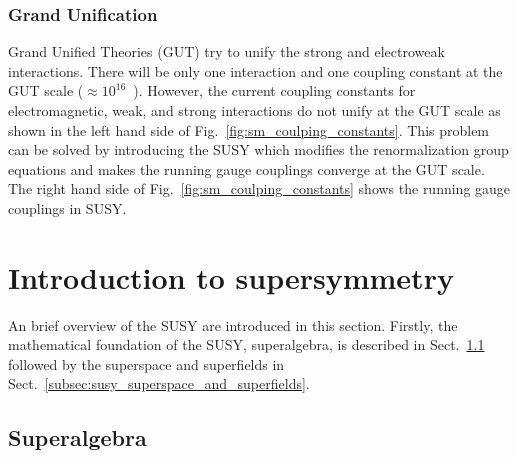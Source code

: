 
\subsubsection{Grand Unification}
\label{subsubsec:susy_gut}
Grand Unified Theories (GUT) try to unify the strong and electroweak interactions.
There will be only one interaction and one coupling constant at the GUT scale ($\approx 10^{16}$~{\GeV}).
However, the current coupling constants for electromagnetic, weak, and strong interactions do not unify at the GUT scale as shown in the left hand side of Fig.~\ref{fig:sm_coulping_constants}.
This problem can be solved by introducing the SUSY which modifies the renormalization group equations and makes the running gauge couplings converge at the GUT scale.
The right hand side of Fig.~\ref{fig:sm_coulping_constants} shows the running gauge couplings in SUSY.


\section{Introduction to supersymmetry}
\label{sec:susy_intro}
An brief overview of the SUSY are introduced in this section.
Firstly, the mathematical foundation of the SUSY, superalgebra, is described in Sect.~\ref{subsec:susy_superalgebra} followed by the superspace and superfields in Sect.~\ref{subsec:susy_superspace_and_superfields}.


\subsection{Superalgebra}
\label{subsec:susy_superalgebra}


